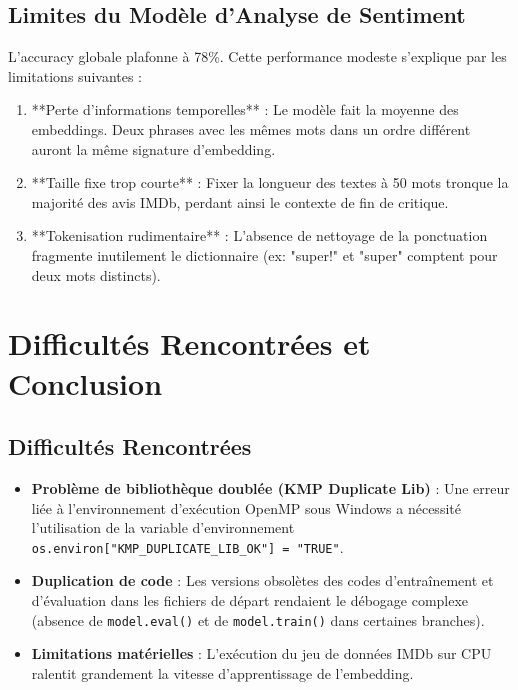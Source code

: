 \documentclass[12pt,a4paper,oneside]{report}
\begin{document}
\section{Limites du Modèle d'Analyse de Sentiment}
L'accuracy globale plafonne à 78\%. Cette performance modeste s'explique par les limitations suivantes :
\begin{enumerate}
    \item **Perte d'informations temporelles** : Le modèle fait la moyenne des embeddings. Deux phrases avec les mêmes mots dans un ordre différent auront la même signature d'embedding.
    \item **Taille fixe trop courte** : Fixer la longueur des textes à 50 mots tronque la majorité des avis IMDb, perdant ainsi le contexte de fin de critique.
    \item **Tokenisation rudimentaire** : L'absence de nettoyage de la ponctuation fragmente inutilement le dictionnaire (ex: "super!" et "super" comptent pour deux mots distincts).
\end{enumerate}

\chapter{Difficultés Rencontrées et Conclusion}

\section{Difficultés Rencontrées}
\begin{itemize}
    \item \textbf{Problème de bibliothèque doublée (KMP Duplicate Lib)} : Une erreur liée à l'environnement d'exécution OpenMP sous Windows a nécessité l'utilisation de la variable d'environnement \texttt{os.environ["KMP\_DUPLICATE\_LIB\_OK"] = "TRUE"}.
    \item \textbf{Duplication de code} : Les versions obsolètes des codes d'entraînement et d'évaluation dans les fichiers de départ rendaient le débogage complexe (absence de \texttt{model.eval()} et de \texttt{model.train()} dans certaines branches).
    \item \textbf{Limitations matérielles} : L'exécution du jeu de données IMDb sur CPU ralentit grandement la vitesse d'apprentissage de l'embedding.
\end{itemize}
\end{document}
